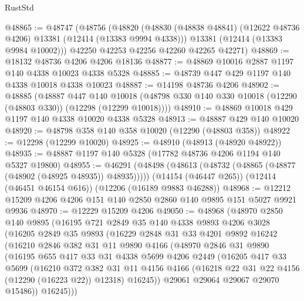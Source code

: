 \begin{lexlean}{RustStd}
\begin{coremodule}
{\begin{coremodule}
{{{{{{{{{{{{{{{{{{{{{{{{{{{{{{{{{{{{{{{{{{{{{{{{{{@48865 := @48747
    (@48756
      (@48820
        (@48830 (@48838 @48841) (@12622 @48736 @4206) @13381 (@12414 (@13383 @9994 @4338)))
        @13381
        (@12414 (@13383 @9984 @10002)))
      @42250
      @42253
      @42256
      @42260
      @42265
      @42271)
@48869 := @18132 @48736 @4206 @4206 @18136
@48877 := @48869 @10016 @2887 @1197 @140 @4338 @10023 @4338 @5328
@48885 := @48739 @447 @429 @1197 @140 @4338 @10018 @4338 @10023
@48887 := @14198 @48736 @4206
@48902 := @48885
    (@48887
      @447
      @140
      @10018
      (@48798 @330 @140 @330 @10018 (@12290 (@48803 @330)) (@12298 (@12299 @10018))))
@48910 := @48869 @10018 @429 @1197 @140 @4338 @10020 @4338 @5328
@48913 := @48887 @429 @140 @10020
@48920 := @48798 @358 @140 @358 @10020 (@12290 (@48803 @358))
@48922 := @12298 (@12299 @10020)
@48925 := @48910 (@48913 (@48920 @48922))
@48935 := @48887 @1197 @140 @5328 (@17782 @48736 @4206 @1194 @140 @5327 @19800)
@48955 := @46291
    (@48498 (@48613 (@48732 (@48865 (@48877 (@48902 (@48925 @48935)) @48935)))))
    (@14154 (@46447 @265))
    (@12414 (@46451 @46154 @616))
    (@12206 (@16189 @9883 @46288))
@48968 := @12212 @15209 @4206 @4206 @151 @140 @2850 @2860 @140 @9895 @151 @5027 @9921 @9936
@48970 := @12229 @15209 @4206
@49050 := @48968
    (@48970
      @2850
      @140
      @9895
      (@16195
        @721
        @2849
        @35
        @140
        @4338
        @9893
        @4206
        @3028
        (@16205
          @2849
          @35
          @9893
          (@16229
            @2848
            @31
            @33
            @4201
            @9892
            @16242
            (@16210
              @2846
              @382
              @31
              @11
              @9890
              @4166
              (@48970
                @2846
                @31
                @9890
                (@16195
                  @655
                  @417
                  @33
                  @31
                  @4338
                  @5699
                  @4206
                  @2449
                  (@16205
                    @417
                    @33
                    @5699
                    (@16210
                      @372
                      @382
                      @31
                      @11
                      @4156
                      @4166
                      (@16218 @22 @31 @22 @4156 (@12290 (@16223 @22)) @12318)
                      @16245))
                  @29061
                  @29064
                  @29067
                  @29070
                  @15486))
              @16245)))
}}}}}}}}}}}}}}}}}}}}}}}}}}}}}}}}}}}}}}}}}}}}}}}}}}
\end{coremodule}}
\end{coremodule}
\end{lexlean}
